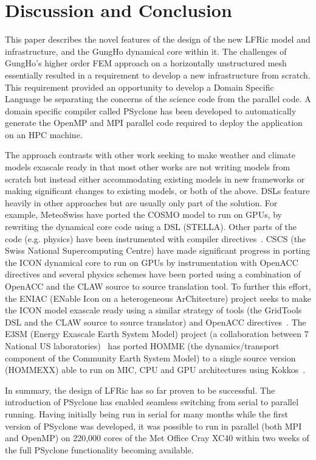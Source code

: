 \documentclass[review,times]{elsarticle}
\begin{document}
\section{\label{sec:con}Discussion and Conclusion}

This paper describes the novel features of the design of the new LFRic
model and infrastructure, and the GungHo dynamical core within it. The
challenges of GungHo's higher order FEM approach on a horizontally
unstructured mesh essentially resulted in a requirement to develop a
new infrastructure from scratch. This requirement provided an
opportunity to develop a Domain Specific Language be separating the
concerns of the science code from the parallel code.  A domain
specific compiler called PSyclone has been developed to automatically
generate the OpenMP and MPI parallel code required to deploy the
application on an HPC machine.

The approach contrasts with other work seeking to make
weather and climate models exascale ready in that most other works
are not writing models from scratch but instead either accommodating
existing models in new frameworks or making significant changes to
existing models, or both of the above. DSLs feature heavily in other
approaches but are usually only part of the solution. For example,
MeteoSwiss have ported the COSMO model to run on GPUs, by
rewriting the dynamical core code using a DSL (STELLA). Other parts
of the code (e.g. physics) have been instrumented with compiler
directives~\cite{JSFI17}. CSCS (the Swiss National  Supercomputing
Centre) have made significant progress in porting the ICON dynamical
core to run on GPUs by instrumentation with OpenACC directives and
several physics schemes have been ported using a combination of
OpenACC and the CLAW source to source translation tool. To further
this effort, the ENIAC (ENable Icon on a heterogeneous ArChitecture)
project seeks to make the ICON model exascale ready using a similar
strategy of tools (the GridTools DSL and the CLAW source to source
translator) and OpenACC directives~\cite{ENIACDocs}.
The E3SM (Energy Exascale Earth System Model) project (a collaboration
between 7 National US laboratories)~\cite{E3SMDocs} has ported
HOMME (the dynamics/transport component of the Community Earth System
Model) to a single source version (HOMMEXX) able to run on MIC,
CPU and GPU architectures using Kokkos~\cite{KokkosGitHub}.

In summary, the design of LFRic has so far proven to be successful. The
introduction of PSyclone has enabled seamless switching from serial to
parallel running. Having initially being run in serial for many
months while the first version of PSyclone was developed, it was possible
to run in parallel (both MPI and OpenMP) on 220,000 cores of the Met Office
Cray XC40 within two weeks of the full PSyclone functionality
becoming available.
\end{document}
